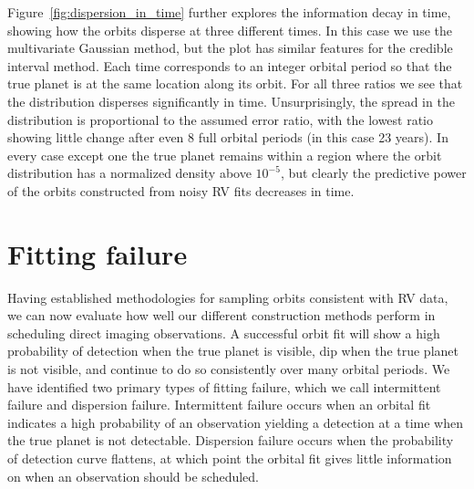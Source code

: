 Figure~\ref{fig:dispersion_in_time} further explores the information decay in time, showing how the
orbits disperse at three different times.  In this case we use the multivariate Gaussian method, but
the plot has similar features for the credible interval method.  Each time corresponds to an integer
orbital period so that the true planet is at the same location along its orbit. For all three ratios
we see that the distribution disperses significantly in time.  Unsurprisingly, the spread in the
distribution is proportional to the assumed error ratio, with the lowest ratio showing little change
after even 8 full orbital periods (in this case 23 years). In every case except one the true planet
remains within a region where the orbit distribution has a normalized density above $10^{-5}$, but
clearly the predictive power of the orbits constructed from noisy RV fits decreases in time.

\section{Fitting failure}%
\label{sec:fitting_failure}

Having established methodologies for sampling orbits consistent with RV data, we can now evaluate
how well our different construction methods perform in scheduling direct imaging observations. A
successful orbit fit will show a high probability of detection when the true planet is visible, dip
when the true planet is not visible, and continue to do so consistently over many orbital periods.
We have identified two primary types of fitting failure, which we call intermittent failure and
dispersion failure. Intermittent failure occurs when an orbital fit indicates a high probability of
an observation yielding a detection at a time when the true planet is not detectable. Dispersion
failure occurs when the probability of detection curve flattens, at which point the orbital fit
gives little information on when an observation should be scheduled.

